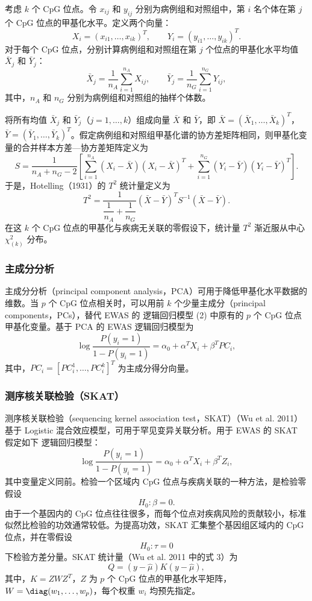 考虑 $k$ 个 CpG 位点。令 $x_{ij}$ 和 $y_{ij}$ 分别为病例组和对照组中，第 $i$ 名个体在第 $j$ 个 CpG 位点的甲基化水平。定义两个向量：
\[
X_i=(x_{i1},\ldots,x_{ik})^T,\qquad Y_i=(y_{i1},\ldots,y_{ik})^T.
\]
对于每个 CpG 位点，分别计算病例组和对照组在第 $j$ 个位点的甲基化水平均值 $\bar X_j$ 和 $\bar Y_j$：
\[
\bar X_j=\frac1{n_A}\sum_{i=1}^{n_A}X_{ij},\qquad
\bar Y_j=\frac1{n_G}\sum_{i=1}^{n_G}Y_{ij},
\]
其中，$n_A$ 和 $n_G$ 分别为病例组和对照组的抽样个体数。

将所有均值 $\bar X_j$ 和 $\bar Y_j$（$j=1,\ldots,k$）组成向量 $\bar X$ 和 $\bar Y$，即 $\bar X=(\bar X_1,\ldots,\bar X_k)^T$，$\bar Y=(\bar Y_1,\ldots,\bar Y_k)^T$。假定病例组和对照组甲基化谱的协方差矩阵相同，则甲基化变量的合并样本方差—协方差矩阵定义为
\[
S=\frac1{n_A+n_G-2}\left[
\sum_{i=1}^{n_A}(X_i-\bar X)(X_i-\bar X)^T
+\sum_{i=1}^{n_G}(Y_i-\bar Y)(Y_i-\bar Y)^T
\right].
\]
于是，Hotelling（1931）的 $T^2$ 统计量定义为
\begin{equation}
T^2=\frac1{\dfrac1{n_A}+\dfrac1{n_G}}
(\bar X-\bar Y)^T S^{-1}(\bar X-\bar Y).
\tag{5.3}
\end{equation}
在这 $k$ 个 CpG 位点的甲基化与疾病无关联的零假设下，统计量 $T^2$ 渐近服从中心 $\chi^2_{(k)}$ 分布。

\subsubsection{主成分分析}

主成分分析（principal component analysis，PCA）可用于降低甲基化水平数据的维数。当 $p$ 个 CpG 位点相关时，可以用前 $k$ 个少量主成分（principal components，PCs），替代 EWAS 的 逻辑回归模型 (2) 中原有的 $p$ 个 CpG 位点甲基化变量。基于 PCA 的 EWAS 逻辑回归模型为
\begin{equation}
\log\frac{P(y_i=1)}{1-P(y_i=1)}=\alpha_0+\alpha^TX_i+\beta^T PC_i,
\tag{5.4}
\end{equation}
其中，$PC_i=[PC_i^1,\ldots,PC_i^k]^T$ 为主成分得分向量。

\subsubsection{测序核关联检验（SKAT）}

测序核关联检验（sequencing kernel association test，SKAT）（Wu et al. 2011）基于 Logistic 混合效应模型，可用于罕见变异关联分析。用于 EWAS 的 SKAT 假定如下 逻辑回归模型：
\[
\log\frac{P(y_i=1)}{1-P(y_i=1)}=\alpha_0+\alpha^TX_i+\beta^TZ_i,
\]
其中变量定义同前。检验一个区域内 CpG 位点与疾病关联的一种方法，是检验零假设
\[
H_0:\beta=0.
\]
由于一个基因内的 CpG 位点往往很多，而每个位点对疾病风险的贡献较小，标准似然比检验的功效通常较低。为提高功效，SKAT 汇集整个基因组区域内的 CpG 位点，并在零假设
\[
H_0:\tau=0
\]
下检验方差分量。SKAT 统计量（Wu et al. 2011 中的式 3）为
\begin{equation}
Q=(y-\widehat\mu)K(y-\widehat\mu),
\tag{5.5}
\end{equation}
其中，$K=ZWZ^T$，$Z$ 为 $p$ 个 CpG 位点的甲基化水平矩阵，$W=\diag(w_1,\ldots,w_p)$，每个权重 $w_i$ 均预先指定。

